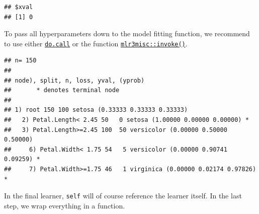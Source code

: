\documentclass[]{article}
\newenvironment{Shaded}{\begin{snugshade}}{\end{snugshade}}
\newcommand{\ControlFlowTok}[1]{\textcolor[rgb]{0.13,0.29,0.53}{\textbf{#1}}}
\newcommand{\DataTypeTok}[1]{\textcolor[rgb]{0.13,0.29,0.53}{#1}}
\newcommand{\KeywordTok}[1]{\textcolor[rgb]{0.13,0.29,0.53}{\textbf{#1}}}
\newcommand{\NormalTok}[1]{#1}
\newcommand{\OperatorTok}[1]{\textcolor[rgb]{0.81,0.36,0.00}{\textbf{#1}}}
\newcommand{\StringTok}[1]{\textcolor[rgb]{0.31,0.60,0.02}{#1}}
\renewenvironment{Shaded} {\begin{snugshade}\small} {\end{snugshade}}
\begin{document}
\begin{verbatim}
## $xval
## [1] 0
\end{verbatim}

To pass all hyperparameters down to the model fitting function, we recommend to use either \href{https://www.rdocumentation.org/packages/base/topics/do.call}{\texttt{do.call}} or the function \href{https://mlr3misc.mlr-org.com/reference/invoke.html}{\texttt{mlr3misc::invoke()}}.

\begin{Shaded}
\end{Shaded}

\begin{verbatim}
## n= 150 
## 
## node), split, n, loss, yval, (yprob)
##       * denotes terminal node
## 
## 1) root 150 100 setosa (0.33333 0.33333 0.33333)  
##   2) Petal.Length< 2.45 50   0 setosa (1.00000 0.00000 0.00000) *
##   3) Petal.Length>=2.45 100  50 versicolor (0.00000 0.50000 0.50000)  
##     6) Petal.Width< 1.75 54   5 versicolor (0.00000 0.90741 0.09259) *
##     7) Petal.Width>=1.75 46   1 virginica (0.00000 0.02174 0.97826) *
\end{verbatim}

In the final learner, \texttt{self} will of course reference the learner itself.
In the last step, we wrap everything in a function.

\begin{Shaded}
\end{Shaded}
\end{document}

